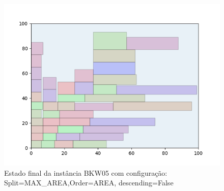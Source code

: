 \begin{figure}[H]
    \centering
    \caption[]{Estado final da instância BKW05 com configuração: Split=MAX_AREA,Order=AREA, descending=False}
    \label{fig:bkw05-max_area-area-false}
    \includegraphics[scale=0.5]{output/figures/bkw/bkw05/max_area/area/false/00}
\end{figure}